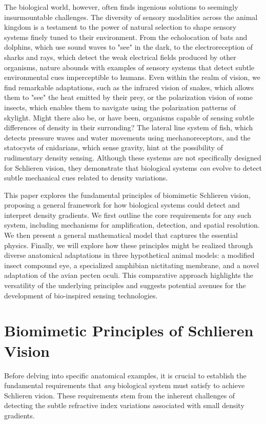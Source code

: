 \documentclass[11pt]{article}
\begin{document}
The biological world, however, often finds ingenious solutions to seemingly insurmountable challenges. The diversity of sensory modalities across the animal kingdom is a testament to the power of natural selection to shape sensory systems finely tuned to their environment. From the echolocation of bats and dolphins, which use sound waves to "see" in the dark, to the electroreception of sharks and rays, which detect the weak electrical fields produced by other organisms, nature abounds with examples of sensory systems that detect subtle environmental cues imperceptible to humans. Even within the realm of vision, we find remarkable adaptations, such as the infrared vision of snakes, which allows them to "see" the heat emitted by their prey, or the polarization vision of some insects, which enables them to navigate using the polarization patterns of skylight. Might there also be, or have been, organisms capable of sensing subtle differences of density in their surronding? The lateral line system of fish, which detects pressure waves and water movements using mechanoreceptors, and the statocysts of cnidarians, which sense gravity, hint at the possibility of rudimentary density sensing. Although these systems are not specifically designed for Schlieren vision, they demonstrate that biological systems \textit{can} evolve to detect subtle mechanical cues related to density variations.

This paper explores the fundamental principles of biomimetic Schlieren vision, proposing a general framework for how biological systems could detect and interpret density gradients. We first outline the core requirements for any such system, including mechanisms for amplification, detection, and spatial resolution. We then present a general mathematical model that captures the essential physics. Finally, we will explore how these principles might be realized through diverse anatomical adaptations in three hypothetical animal models: a modified insect compound eye, a specialized amphibian nictitating membrane, and a novel adaptation of the avian pecten oculi. This comparative approach highlights the versatility of the underlying principles and suggests potential avenues for the development of bio-inspired sensing technologies.

\section{Biomimetic Principles of Schlieren Vision}

Before delving into specific anatomical examples, it is crucial to establish the fundamental requirements that \textit{any} biological system must satisfy to achieve Schlieren vision. These requirements stem from the inherent challenges of detecting the subtle refractive index variations associated with small density gradients.
\end{document}
